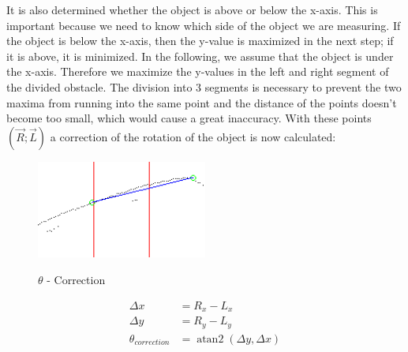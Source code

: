 \documentclass[11pt,oneside,openright]{mpreport}
\DeclareMathOperator{\atantwo}{atan2}
\begin{document}

It is also determined whether the object is above or below the x-axis. This is important because we need to know which side of the object we are measuring.
If the object is below the x-axis, then the y-value is maximized in the next step; if it is above, it is minimized.
In the following, we assume that the object is under the x-axis. Therefore we maximize the y-values in the left and right segment of the divided obstacle.
The division into 3 segments is necessary to prevent the two maxima from running into the same point and the distance of the points doesn't become too small, 
which would cause a great inaccuracy. With these points $(\vec{R};\vec{L})$ a correction of the rotation of the object is now calculated:

\begin{figure}[!ht]
\caption{$\theta$ - Correction}
\includegraphics[width=0.5\textwidth]{bilder/obst_devide_angle.png}
\label{obst_correction}
\end{figure}

\begin{align*}
\Delta x &= R_x - L_x\\
\Delta y &= R_y - L_y\\
\theta_{correction} &= \atantwo(\Delta y,\Delta x)
\end{align*}
\end{document}
